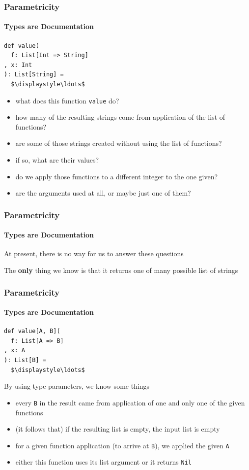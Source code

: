 \begin{frame}[fragile]
\frametitle{Parametricity}
\framesubtitle{Types are Documentation}
\begin{lstlisting}[style=scala,mathescape]
def value(
  f: List[Int => String]
, x: Int
): List[String] =
  $\displaystyle\ldots$
\end{lstlisting}
\begin{itemize}
  \item \tiny{what does this function \lstinline$value$ do?}
  \item \tiny{how many of the resulting strings come from application of the list of functions?}
  \item \tiny{are some of those strings created without using the list of functions?}
  \item \tiny{if so, what are their values?}
  \item \tiny{do we apply those functions to a different integer to the one given?}
  \item \tiny{are the arguments used at all, or maybe just one of them?}
\end{itemize}
\end{frame}


\begin{frame}
\frametitle{Parametricity}
\framesubtitle{Types are Documentation}
\begin{center}
At present, there is no way for us to answer these questions
\end{center}
\begin{center}
The \textbf{only} thing we know is that it returns one of many possible list of strings
\end{center}
\end{frame}


\begin{frame}[fragile]
\frametitle{Parametricity}
\framesubtitle{Types are Documentation}
\begin{lstlisting}[style=scala,mathescape]
def value[A, B](
  f: List[A => B]
, x: A
): List[B] =
  $\displaystyle\ldots$
\end{lstlisting}
\begin{block}{By using type parameters, we know some things}
\begin{itemize}
  \item \tiny{every \lstinline$B$ in the result came from application of one and only one of the given functions}
  \item \tiny{(it follows that) if the resulting list is empty, the input list is empty}
  \item \tiny{for a given function application (to arrive at \lstinline$B$), we applied the given \lstinline$A$}
  \item \tiny{either this function uses its list argument or it returns \lstinline$Nil$}
\end{itemize}
\end{block}
\end{frame}


